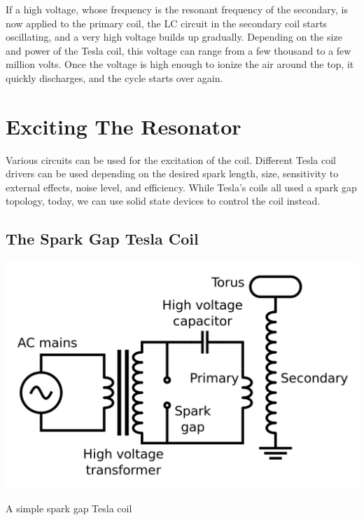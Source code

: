 If a high voltage, whose frequency is the resonant frequency of the secondary, is now applied to the primary coil, the LC circuit in the secondary coil starts oscillating, and a very high voltage builds up gradually. Depending on the size and power of the Tesla coil, this voltage can range from a few thousand to a few million volts. Once the voltage is high enough to ionize the air around the top, it quickly discharges, and the cycle starts over again.

\section{Exciting The Resonator}

Various circuits can be used for the excitation of the coil. Different Tesla coil drivers can be used depending on the desired spark length, size, sensitivity to external effects, noise level, and efficiency. While Tesla's coils all used a spark gap topology, today, we can use solid state devices to control the coil instead.

\subsection{The Spark Gap Tesla Coil}

\begin{marginfigure}
\includegraphics[width=\textwidth]{simon/resources/sparkGapTeslaCoil.png}
\caption{A simple spark gap Tesla coil}
\end{marginfigure}

